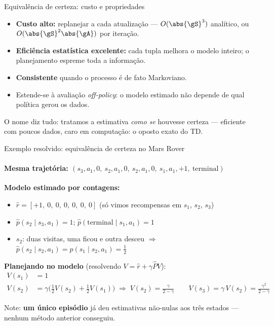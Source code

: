 \documentclass[aspectratio=169, 11pt]{beamer}
\begin{document}
\begin{frame}{Equivalência de certeza: custo e propriedades}
  \begin{itemize}
    \item \textbf{Custo alto:} replanejar a cada atualização —
      $O(\abs{\gS}^3)$ analítico, ou $O(\abs{\gS}^2 \abs{\gA})$ por
      iteração.
    \item \textbf{Eficiência estatística excelente:} cada tupla melhora o
      modelo inteiro; o planejamento espreme toda a informação.
    \item \textbf{Consistente} quando o processo é de fato Markoviano.
    \item Estende-se à avaliação \emph{off-policy}: o modelo estimado não
      depende de qual política gerou os dados.
  \end{itemize}

  \begin{ideiabox}
    O nome diz tudo: tratamos a estimativa \emph{como se} houvesse certeza —
    eficiente com poucos dados, caro em computação: o oposto exato do TD.
  \end{ideiabox}
\end{frame}

\begin{frame}{Exemplo resolvido: equivalência de certeza no Mars Rover}
  \framesubtitle{Mesma trajetória:
    $(s_3, a_1, 0,\ s_2, a_1, 0,\ s_2, a_1, 0,\ s_1, a_1, +1,\ \text{terminal})$}
  \textbf{Modelo estimado por contagens:}
  \begin{itemize}\setlength{\itemsep}{0.15ex}
    \item $\hat{r} = [+1,\ 0,\ 0,\ 0,\ 0,\ 0,\ 0]$
      (só vimos recompensas em $s_1$, $s_2$, $s_3$)
    \item $\hat{p}(s_2 \mid s_3, a_1) = 1$;\quad
      $\hat{p}(\text{terminal} \mid s_1, a_1) = 1$
    \item $s_2$: duas visitas, uma ficou e outra desceu $\Rightarrow$
      $\hat{p}(s_2 \mid s_2, a_1) = \hat{p}(s_1 \mid s_2, a_1) = \tfrac{1}{2}$
  \end{itemize}

  \textbf{Planejando no modelo} (resolvendo $V = \hat{r} + \gamma \hat{P} V$):
  \vspace{-0.4em}
  \begin{align*}
    V(s_1) &= 1\\
    V(s_2) &= \gamma\bigl(\tfrac12 V(s_2) + \tfrac12 V(s_1)\bigr)
      \;\Rightarrow\; V(s_2) = \tfrac{\gamma}{2 - \gamma}
    \qquad
    V(s_3) = \gamma\, V(s_2) = \tfrac{\gamma^2}{2-\gamma}
  \end{align*}
  \vspace{-1.2em}

  Note: \textbf{um único episódio} já deu estimativas não-nulas aos três
  estados — nenhum método anterior conseguiu.
\end{frame}
\end{document}
